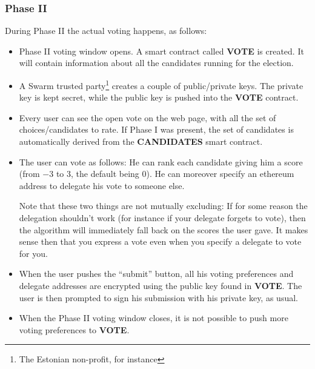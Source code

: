 \documentclass[submission, copyright,creativecommons,sharealike,noncommercial]{eptcs}
\newcommand{\Candidates}{\textbf{CANDIDATES}\xspace}
\newcommand{\Vote}{\textbf{VOTE}\xspace}
\begin{document}
\subsubsection{Phase II}
%
	During Phase II the actual voting happens, as follows:
	\begin{itemize}
		\item Phase II voting window opens. A smart contract called \Vote is created. It will contain information about all the candidates running for the election.
		\item A Swarm trusted party\footnote{The Estonian non-profit, for instance} creates a couple of public/private keys. The private key is kept secret, while the public key is pushed into the \Vote contract.
		\item Every user can see the open vote on the web page, with all the set of choices/candidates to rate. If Phase I was present, the set of candidates is automatically derived from the \Candidates smart contract. 
		\item The user can vote as follows: He can rank each candidate giving him a score (from $-3$ to $3$, the default being $0$). He can moreover specify an ethereum address to delegate his vote to someone else. 
		
		Note that these two things are not mutually excluding: If for some reason the delegation shouldn't work (for instance if your delegate forgets to vote), then the algorithm will immediately fall back on the scores the user gave. It makes sense then that you express a vote even when you specify a delegate to vote for you.
		\item When the user pushes the ``submit'' button, all his voting preferences and delegate addresses are encrypted using the public key found in \Vote. The user is then prompted to sign his submission with his private key, as usual.
		\item When the Phase II voting window closes, it is not possible to push more voting preferences to \Vote.
	\end{itemize}
%
%
\end{document}

